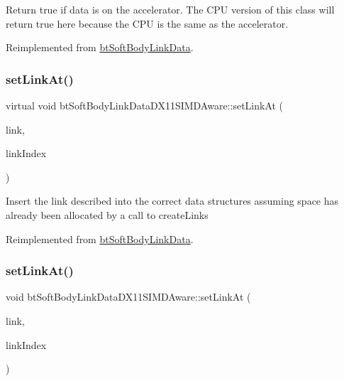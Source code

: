 Return true if data is on the accelerator. The C\+PU version of this class will return true here because the C\+PU is the same as the accelerator. 

Reimplemented from \hyperlink{classbtSoftBodyLinkData_ae284c2a182ddf82dde057a8c2eb17ac3}{bt\+Soft\+Body\+Link\+Data}.

\mbox{\label{classbtSoftBodyLinkDataDX11SIMDAware_ae43f275f9bc20e56ace8b3223b263ce4}} 
\subsubsection{\texorpdfstring{set\+Link\+At()}{setLinkAt()}\hspace{0.1cm}{\footnotesize\ttfamily [1/2]}}
{\footnotesize\ttfamily virtual void bt\+Soft\+Body\+Link\+Data\+D\+X11\+S\+I\+M\+D\+Aware\+::set\+Link\+At (\begin{DoxyParamCaption}\item[{const \hyperlink{classbtSoftBodyLinkData_1_1LinkDescription}{Link\+Description} \&}]{link,  }\item[{int}]{link\+Index }\end{DoxyParamCaption})\hspace{0.3cm}{\ttfamily [virtual]}}

Insert the link described into the correct data structures assuming space has already been allocated by a call to create\+Links 

Reimplemented from \hyperlink{classbtSoftBodyLinkData_a44f200dcb878405cebf3704dc7a8b8cd}{bt\+Soft\+Body\+Link\+Data}.

\mbox{\label{classbtSoftBodyLinkDataDX11SIMDAware_aa8139528d8d1c83643b46e2e3a8a6b35}} 
\subsubsection{\texorpdfstring{set\+Link\+At()}{setLinkAt()}\hspace{0.1cm}{\footnotesize\ttfamily [2/2]}}
{\footnotesize\ttfamily void bt\+Soft\+Body\+Link\+Data\+D\+X11\+S\+I\+M\+D\+Aware\+::set\+Link\+At (\begin{DoxyParamCaption}\item[{const \hyperlink{classbtSoftBodyLinkData_1_1LinkDescription}{Link\+Description} \&}]{link,  }\item[{int}]{link\+Index }\end{DoxyParamCaption})\hspace{0.3cm}{\ttfamily [virtual]}}

